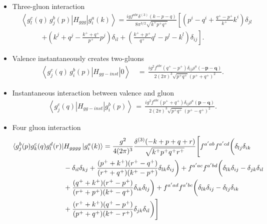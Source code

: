 \documentclass[a4paper,11pt]{article}
\begin{document}
\begin{itemize}
  \item Three-gluon interaction 
    \begin{align}
      \label{m3}
      &\left\langle g_{l}^{c}(q)\, g_{j}^{b}(p)\left|H_{ggg}\right|g_{i}^{a}(k)\right\rangle = \frac{igf^{abc}\delta^{(3)}(k-p-q)}{8\pi^{3/2}\sqrt{k^{+}p^{+}q^{+}}}
      \left[\left({p}^{i}-{q}^{i}+\frac{q^{+}-p^{+}}{k^{+}}{k}^{i}\right)\delta_{jl}\right.\nonumber\\
      &\quad\quad\quad \left.+\left({k}^{j}+{q}^{j}-\frac{k^{+}+q^{+}}{p^{+}}{p}^{j}\right)
      \delta_{il}+\left(\frac{k^{+}+p^{+}}{q^{+}}{q}^{l}-{p}^{l}-{k}^{l}\right)\delta_{ij}\right].
    \end{align}
    \item Valence instantaneously creates two-gluons
    \begin{align}\label{gg1}
\left\langle g_{j}^{c}(q)\, g_{i}^{b}(p)\left|H_{gg-inst}\right|0\right\rangle \,& =\,\frac{ig^{2}f^{abc}(q^{+}-p^{+})\delta_{ij}\rho^{a}(-\mathbf{p}-\mathbf{q})}{2(2\pi)^{3}\sqrt{p^{+}q^{+}}(p^{+}+q^{+})^{2}}.
 \end{align}
  \item Instantaneous  interaction between valence and gluon  
    \begin{align}
      \label{gg2}
      \left\langle g_{j}^{c}(q)\left|H_{gg-inst}\right|g_{i}^{b}(p)\right\rangle \,
      =\,
      \frac{ig^{2}f^{abc}(p^{+}+q^{+})\delta_{ij}\rho^{a}(\mathbf{p}-\mathbf{q})}{2(2\pi)^{3}\sqrt{p^{+}q^{+}}(p^{+}-q^{+})^{2}}.
    \end{align}
    \item Four gluon interaction
      \begin{align}
    \bra{g^{b}_{j}(p)g^{c}_{k}(q)g^{d}_{l}(r)}& H_{gggg}\ket{g^{a}_{i}(k)}  = \frac{g^{2}}{4(2\pi)^{3}}\frac{\delta^{(3)}(-k+p+q+r)}{\sqrt{k^{+}p^{+}q^{+}r^{+}}}\Bigg[f^{a'ab}f^{a'cd}\bigg(\delta_{lj}\delta_{ik}\notag \\ & -\delta_{il}\delta_{kj} +\frac{(p^{+}+k^{+})(r^{+}-q^{+})}{(r^{+}+q^{+})(k^{+}-p^{+})}\delta_{lk}\delta_{ij}\bigg) +f^{a'ac}f^{a'bd}\bigg(\delta_{lk}\delta_{ij}-\delta_{jk}\delta_{il} \notag \\ & +\frac{(q^{+}+k^{+})(r^{+}-p^{+})}{(r^{+}+p^{+})(k^{+}-q^{+})}\delta_{ik}\delta_{lj}\bigg)+f^{a'ad}f^{a'bc}\bigg(\delta_{lk}\delta_{ij}-\delta_{lj}\delta_{ik} \notag \\ & +\frac{(r^{+}+k^{+})(q^{+}-p^{+})}{(p^{+}+q^{+})(k^{+}-r^{+})}\delta_{jk}\delta_{il}\bigg)\Bigg]
    \label{ggg-g}
\end{align}
\begin{align}\label{gg-gg}

\end{align}
\end{itemize}
\end{document}
